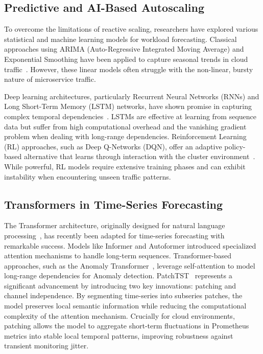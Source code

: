 \documentclass[conference]{IEEEtran}
\begin{document}
\subsection{Predictive and AI-Based Autoscaling}
To overcome the limitations of reactive scaling, researchers have explored various statistical and machine learning models for workload forecasting. Classical approaches using ARIMA (Auto-Regressive Integrated Moving Average) and Exponential Smoothing have been applied to capture seasonal trends in cloud traffic~\cite{yan2021hansel}. However, these linear models often struggle with the non-linear, bursty nature of microservice traffic.

Deep learning architectures, particularly Recurrent Neural Networks (RNNs) and Long Short-Term Memory (LSTM) networks, have shown promise in capturing complex temporal dependencies~\cite{imdoukh2020machine}. LSTMs are effective at learning from sequence data but suffer from high computational overhead and the vanishing gradient problem when dealing with long-range dependencies. Reinforcement Learning (RL) approaches, such as Deep Q-Networks (DQN), offer an adaptive policy-based alternative that learns through interaction with the cluster environment~\cite{qiu2020firm}. While powerful, RL models require extensive training phases and can exhibit instability when encountering unseen traffic patterns.

\subsection{Transformers in Time-Series Forecasting}
The Transformer architecture, originally designed for natural language processing~\cite{vaswani2017attention}, has recently been adapted for time-series forecasting with remarkable success. Models like Informer and Autoformer introduced specialized attention mechanisms to handle long-term sequences. Transformer-based approaches, such as the Anomaly Transformer~\cite{xu2022anomaly}, leverage self-attention to model long-range dependencies for Anomaly detection. PatchTST~\cite{nie2023patchtst} represents a significant advancement by introducing two key innovations: patching and channel independence. By segmenting time-series into subseries patches, the model preserves local semantic information while reducing the computational complexity of the attention mechanism. Crucially for cloud environments, patching allows the model to aggregate short-term fluctuations in Prometheus metrics into stable local temporal patterns, improving robustness against transient monitoring jitter.
\end{document}
